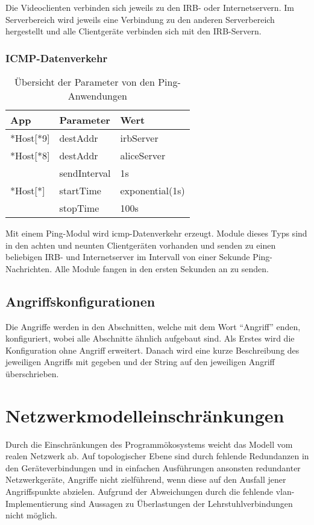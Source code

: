 Die Videoclienten verbinden sich jeweils zu den IRB- oder Internetservern. Im Serverbereich wird jeweils eine Verbindung zu den anderen Serverbereich hergestellt und alle Clientgeräte verbinden sich mit den IRB-Servern.

\subsubsection{ICMP-Datenverkehr}
\begin{table}[ht]
	\centering
	\begin{tabularx}{\textwidth}{|l|X|X|}
		\hline
		\rowcolor{Gainsboro!60}
		App & Parameter    & Wert            \\ \hline
		*Host{[}*9{]}                 & destAddr     & irbServer       \\ \hline
		*Host{[}*8{]}                 & destAddr     & aliceServer     \\ \hline
		\multirow{3}{*}{*Host{[}*{]}} & sendInterval & 1s              \\ \cline{2-3}
		& startTime    & exponential(1s) \\ \cline{2-3}
		& stopTime     & 100s            \\ \hline
	\end{tabularx}
	\caption{Übersicht der Parameter von den Ping-Anwendungen}
	\label{tab:pingModul}
\end{table}
Mit einem Ping-Modul wird \gls{icmp}-Datenverkehr erzeugt. Module dieses Typs sind in den achten und neunten Clientgeräten vorhanden und senden zu einen beliebigen IRB- und Internetserver im Intervall von einer Sekunde Ping-Nachrichten. Alle Module fangen in den ersten Sekunden an zu senden.

\subsection{Angriffskonfigurationen}
Die Angriffe werden in den Abschnitten, welche mit dem Wort \enquote{Angriff} enden, konfiguriert, wobei alle Abschnitte ähnlich aufgebaut sind. Als Erstes wird die Konfiguration ohne Angriff erweitert. Danach wird eine kurze Beschreibung des jeweiligen Angriffs mit  gegeben und der String  auf den jeweiligen Angriff überschrieben. 

\section{Netzwerkmodelleinschränkungen}
Durch die Einschränkungen des Programmökosystems weicht das Modell vom realen Netzwerk ab. Auf topologischer Ebene sind durch fehlende Redundanzen in den Geräteverbindungen und in einfachen Ausführungen ansonsten redundanter Netzwerkgeräte, Angriffe nicht zielführend, wenn diese auf
den Ausfall jener Angriffspunkte abzielen. Aufgrund der Abweichungen durch die fehlende \gls{vlan}-Implementierung sind Aussagen zu Überlastungen der Lehrstuhlverbindungen nicht möglich. 

